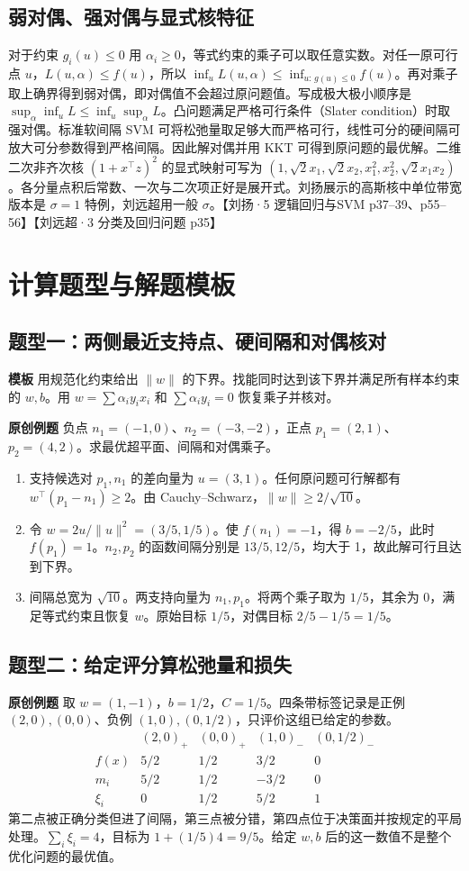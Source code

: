 \documentclass[UTF8,a4paper,zihao=-4,fontset=fandol]{ctexrep}
\begin{document}
\subsection*{弱对偶、强对偶与显式核特征}
对于约束 $g_i(u)\le0$ 用 $\alpha_i\ge0$，等式约束的乘子可以取任意实数。对任一原可行点 $u$，$L(u,\alpha)\le f(u)$，所以 $\inf_u L(u,\alpha)\le \inf_{u:\,g(u)\le0}f(u)$。再对乘子取上确界得到弱对偶，即对偶值不会超过原问题值。写成极大极小顺序是 $\sup_\alpha\inf_u L\le\inf_u\sup_\alpha L$。凸问题满足严格可行条件（Slater condition）时取强对偶。标准软间隔 SVM 可将松弛量取足够大而严格可行，线性可分的硬间隔可放大可分参数得到严格间隔。因此解对偶并用 KKT 可得到原问题的最优解。二维二次非齐次核 $(1+x^\top z)^2$ 的显式映射可写为 $(1,\sqrt2x_1,\sqrt2x_2,x_1^2,x_2^2,\sqrt2x_1x_2)$。各分量点积后常数、一次与二次项正好是展开式。刘扬展示的高斯核中单位带宽版本是 $\sigma=1$ 特例，刘远超用一般 $\sigma$。【刘扬·5 逻辑回归与SVM p37–39、p55–56】【刘远超·3 分类及回归问题 p35】

\section{计算题型与解题模板}
\subsection*{题型一：两侧最近支持点、硬间隔和对偶核对}
\textbf{模板} 用规范化约束给出 $\|w\|$ 的下界。找能同时达到该下界并满足所有样本约束的 $w,b$。用 $w=\sum\alpha_i y_ix_i$ 和 $\sum\alpha_i y_i=0$ 恢复乘子并核对。

\textbf{原创例题} 负点 $n_1=(-1,0)$、$n_2=(-3,-2)$，正点 $p_1=(2,1)$、$p_2=(4,2)$。求最优超平面、间隔和对偶乘子。
\begin{enumerate}
\item 支持候选对 $p_1,n_1$ 的差向量为 $u=(3,1)$。任何原问题可行解都有 $w^\top(p_1-n_1)\ge2$。由 Cauchy–Schwarz，$\|w\|\ge2/\sqrt{10}$。
\item 令 $w=2u/\|u\|^2=(3/5,1/5)$。使 $f(n_1)=-1$，得 $b=-2/5$，此时 $f(p_1)=1$。$n_2,p_2$ 的函数间隔分别是 $13/5,12/5$，均大于 1，故此解可行且达到下界。
\item 间隔总宽为 $\sqrt{10}$。两支持向量为 $n_1,p_1$。将两个乘子取为 $1/5$，其余为 0，满足等式约束且恢复 $w$。原始目标 $1/5$，对偶目标 $2/5-1/5=1/5$。
\end{enumerate}

\subsection*{题型二：给定评分算松弛量和损失}
\textbf{原创例题} 取 $w=(1,-1)$，$b=1/2$，$C=1/5$。四条带标签记录是正例 $(2,0),(0,0)$、负例 $(1,0),(0,1/2)$，只评价这组已给定的参数。
\[
\begin{array}{c|rrrr}
 & (2,0)_+&(0,0)_+&(1,0)_-&(0,1/2)_-\\\hline
 f(x)&5/2&1/2&3/2&0\\
 m_i&5/2&1/2&-3/2&0\\
 \xi_i&0&1/2&5/2&1
\end{array}
\]
第二点被正确分类但进了间隔，第三点被分错，第四点位于决策面并按规定的平局处理。$\sum_i\xi_i=4$，目标为 $1+(1/5)4=9/5$。给定 $w,b$ 后的这一数值不是整个优化问题的最优值。
\end{document}
